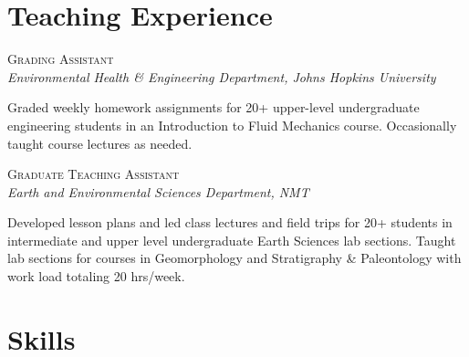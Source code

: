 \documentclass[11pt, letterpaper]{article}
\newcommand{\years}[1]{\marginnote{\scriptsize #1}}
\begin{document}
\section*{Teaching Experience}
\noindent
\years{2019}\textsc{Grading Assistant}\\
\textit{Environmental Health \& Engineering Department, Johns Hopkins University}
\begin{adjustwidth}{5pt}{0pt}
	Graded weekly homework assignments for 20+ upper-level undergraduate
	engineering students in an Introduction to Fluid Mechanics course.
	Occasionally taught course lectures as needed.
\end{adjustwidth}
\years{2015 - 2016}\textsc{Graduate Teaching Assistant}\\
\textit{Earth and Environmental Sciences Department, NMT}
\begin{adjustwidth}{5pt}{0pt}
    Developed lesson plans and led class lectures and field trips for 20+
    students in intermediate and upper level undergraduate Earth Sciences lab
    sections. Taught lab sections for courses in Geomorphology and Stratigraphy
    \& Paleontology with work load totaling 20 hrs/week.  
\end{adjustwidth}

\section*{Skills}
\end{document}
